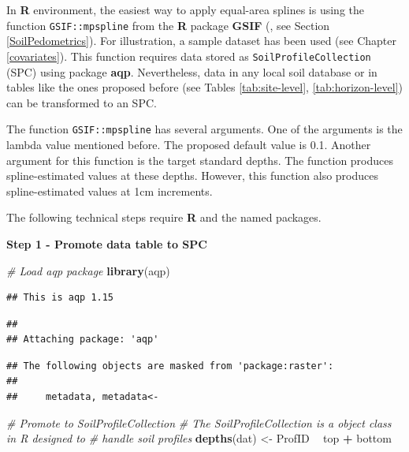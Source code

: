 \documentclass[10pt,b5paper,]{book}
\newenvironment{Shaded}{\begin{snugshade}}{\end{snugshade}}
\newcommand{\CommentTok}[1]{\textcolor[rgb]{0.56,0.35,0.01}{\textit{#1}}}
\newcommand{\KeywordTok}[1]{\textcolor[rgb]{0.13,0.29,0.53}{\textbf{#1}}}
\newcommand{\NormalTok}[1]{#1}
\newcommand{\OperatorTok}[1]{\textcolor[rgb]{0.81,0.36,0.00}{\textbf{#1}}}
\newcommand{\StringTok}[1]{\textcolor[rgb]{0.31,0.60,0.02}{#1}}
\theoremstyle{definition}
\theoremstyle{definition}
\theoremstyle{definition}
\theoremstyle{remark}
\begin{document}
In \textbf{R} environment, the easiest way to apply equal-area splines
is using the function \texttt{GSIF::mpspline} from the \textbf{R}
package \textbf{GSIF} (\citep{hengl_2016_gsif}, see Section
\ref{SoilPedometrics}). For illustration, a sample dataset has been used
(see Chapter \ref{covariates}). This function requires data stored as
\texttt{SoilProfileCollection} (SPC) using package \textbf{aqp}.
Nevertheless, data in any local soil database or in tables like the ones
proposed before (see Tables \ref{tab:site-level},
\ref{tab:horizon-level}) can be transformed to an SPC.

The function \texttt{GSIF::mpspline} has several arguments. One of the
arguments is the lambda value mentioned before. The proposed default
value is 0.1. Another argument for this function is the target standard
depths. The function produces spline-estimated values at these depths.
However, this function also produces spline-estimated values at 1cm
increments.

The following technical steps require \textbf{R} and the named packages.

\textbf{Step 1 - Promote data table to SPC}

\begin{Shaded}
\begin{Highlighting}[]
\CommentTok{# Load aqp package}
\KeywordTok{library}\NormalTok{(aqp)}
\end{Highlighting}
\end{Shaded}

\begin{verbatim}
## This is aqp 1.15
\end{verbatim}

\begin{verbatim}
## 
## Attaching package: 'aqp'
\end{verbatim}

\begin{verbatim}
## The following objects are masked from 'package:raster':
## 
##     metadata, metadata<-
\end{verbatim}

\begin{Shaded}
\begin{Highlighting}[]
\CommentTok{# Promote to SoilProfileCollection }
\CommentTok{# The SoilProfileCollection is a object class in R designed to }
\CommentTok{# handle soil profiles}
\KeywordTok{depths}\NormalTok{(dat) <-}\StringTok{ }\NormalTok{ProfID }\OperatorTok{~}\StringTok{ }\NormalTok{top }\OperatorTok{+}\StringTok{ }\NormalTok{bottom}
\end{Highlighting}
\end{Shaded}
\end{document}
